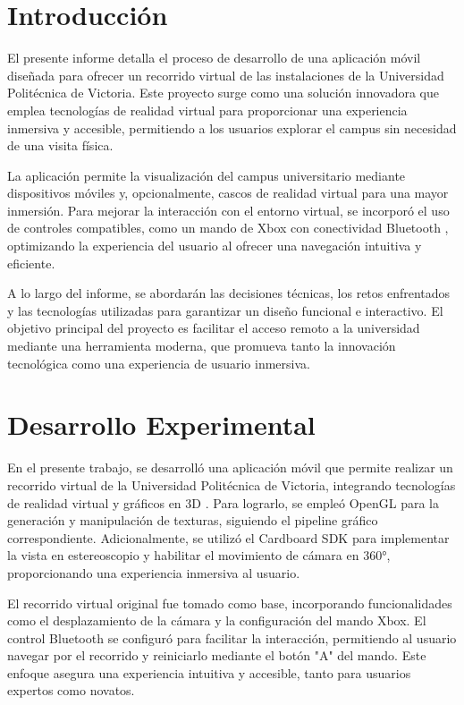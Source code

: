 \documentclass[conference]{IEEEtran}
\begin{document}
\section{Introducción}
El presente informe detalla el proceso de desarrollo de una aplicación móvil diseñada para ofrecer un recorrido virtual \cite{Sh:1} de las instalaciones de la Universidad Politécnica de Victoria. Este proyecto surge como una solución innovadora que emplea tecnologías de realidad virtual para proporcionar una experiencia inmersiva y accesible, permitiendo a los usuarios explorar el campus sin necesidad de una visita física.

La aplicación permite la visualización del campus universitario mediante dispositivos móviles y, opcionalmente, cascos de realidad virtual para una mayor inmersión. Para mejorar la interacción con el entorno virtual, se incorporó el uso de controles compatibles, como un mando de Xbox con conectividad Bluetooth \cite{Sh:5}, optimizando la experiencia del usuario al ofrecer una navegación intuitiva y eficiente.

A lo largo del informe, se abordarán las decisiones técnicas, los retos enfrentados y las tecnologías utilizadas para garantizar un diseño funcional e interactivo. El objetivo principal del proyecto es facilitar el acceso remoto a la universidad mediante una herramienta moderna, que promueva tanto la innovación tecnológica como una experiencia de usuario inmersiva.
 
 
\section{Desarrollo Experimental}

En el presente trabajo, se desarrolló una aplicación móvil que permite realizar un recorrido virtual de la Universidad Politécnica de Victoria, integrando tecnologías de realidad virtual y gráficos en 3D \cite{Sh:7}. Para lograrlo, se empleó OpenGL \cite{Sh:2} para la generación y manipulación de texturas, siguiendo el pipeline gráfico correspondiente. Adicionalmente, se utilizó el Cardboard SDK \cite{Sh:6} para implementar la vista en estereoscopio y habilitar el movimiento de cámara en 360°, proporcionando una experiencia inmersiva al usuario.

El recorrido virtual original fue tomado como base, incorporando funcionalidades como el desplazamiento de la cámara y la configuración del mando Xbox. El control Bluetooth se configuró para facilitar la interacción, permitiendo al usuario navegar por el recorrido y reiniciarlo mediante el botón "A" del mando. Este enfoque asegura una experiencia intuitiva y accesible, tanto para usuarios expertos como novatos.
\end{document}
